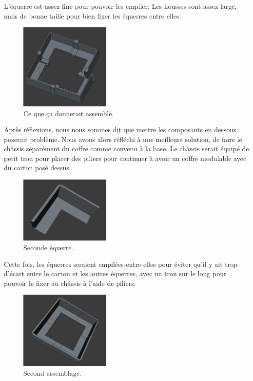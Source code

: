 \documentclass[a4paper,12pt]{report}  %
\begin{document}
L’équerre est assez fine pour pouvoir les empiler. Les housses sont assez large, mais de bonne taille pour bien fixer les équerres entre elles.

\begin{figure}[H]
	\centering
	\includegraphics[width=0.4\textwidth]{./attachments/cad_assemblage.jpg}
	\caption{Ce que ça donnerait assemblé.}
\end{figure}

Après réflexions, nous nous sommes dit que mettre les composants en dessous poserait problème. Nous avons alors réfléchi à une meilleure solution, de faire le châssis séparément du coffre comme convenu à la base. Le châssis serait équipé de petit trou pour placer des piliers pour continuer à avoir un coffre modulable avec du carton posé dessus. 

\begin{figure}[H]
	\centering
	\includegraphics[width=0.4\textwidth]{./attachments/cad_equerre_v2.jpg}
	\caption{Seconde équerre.}
\end{figure}

Cette fois, les équerres seraient empilées entre elles pour éviter qu’il y ait trop d’écart entre le carton et les autres équerres, avec un trou sur le long pour pouvoir le fixer au châssis à l’aide de piliers.

\begin{figure}[H]
	\centering
	\includegraphics[width=0.4\textwidth]{./attachments/cad_assemblage_v2.jpg}
	\caption{Second assemblage.}
\end{figure}
\end{document}
